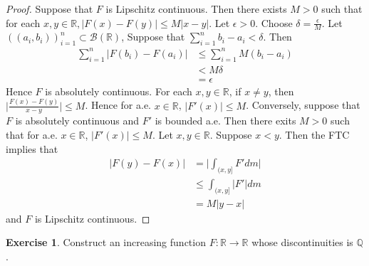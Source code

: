 \documentclass[12pt]{amsart}
\theoremstyle{definition}
\newtheorem{ex}[definition]{Exercise}
\newcommand{\del}{\delta}
\newcommand{\ep}{\epsilon}
\newcommand{\R}{\mathbb{R}}
\newcommand{\Q}{\mathbb{Q}}
\newcommand{\MB}{\mathcal{B}}
\newcommand{\lex}[1]{\label{ex:#1}}
\begin{document}
	\begin{proof}
		Suppose that $F$ is Lipschitz continuous. Then there exists $M>0$ such that for each $x,y \in \R, |F(x)-F(y)| \leq M|x-y|$. Let $\ep >0$. Choose $\del = \frac{\ep}{M}$. Let $((a_i, b_i))_{i=1}^n \subset \MB(\R)$, Suppose that $\sum_{i=1}^n b_i-a_i < \del$. Then 
		\begin{align*}
			\sum_{i=1}^n|F(b_i)-F(a_i)| 
			&\leq \sum_{i=1}^n M(b_i - a_i)\\
			&< M\del\\
			&= \ep
		\end{align*}
		Hence $F$ is absolutely continuous. For each $x, y \in \R$, if $x \neq y$, then $\bigg|\frac{F(x)-F(y)}{x-y}\bigg| \leq M$. Hence for a.e. $x \in \R$, $|F'(x)| \leq M$. Conversely, suppose that $F$ is absolutely continuous and $F'$ is bounded a.e. Then there exits $M> 0$ such that for a.e. $x \in \R$, $|F'(x)| \leq M$. Let $x,y \in \R$. Suppose $x<y$. Then the FTC implies that 
		\begin{align*}
			|F(y)-F(x)|
			& = \bigg|\int_{(x,y]}F'dm\bigg|\\
			&\leq \int_{(x,y]}|F'|dm\\
			&=M|y-x|
		\end{align*}
		and $F$ is Lipschitz continuous.
	\end{proof}
	
	\begin{ex} \lex{00000} 
		Construct an increasing function $F: \R \rightarrow \R$ whose discontinuities is $\Q$.
	\end{ex}
	
\end{document}
